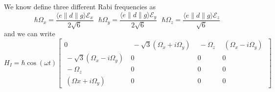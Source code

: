 \documentclass[11pt,letter]{article}
\begin{document}
We know define three different Rabi frequencies as 
\begin{equation}
    \hbar\Omega_{x} = \frac{ \langle e \lVert d \rVert g \rangle \mathcal{E}_{x} }{ 2\sqrt{6}}  \ \ \ 
    \hbar\Omega_{y} = \frac{ \langle e \lVert d \rVert g \rangle \mathcal{E}_{y} }{ 2\sqrt{6}}  \ \ \ 
    \hbar\Omega_{z} = \frac{ \langle e \lVert d \rVert g \rangle \mathcal{E}_{z} }{ \sqrt{6}}  
\end{equation}
and we can write 
\begin{equation}  
  H_{I} =  \hbar \cos(\omega t) 
            \left[\begin{smallmatrix}
            0 & \ -\sqrt{3}(\Omega_{x}+i\Omega_{y})\  &\ -\Omega_{z}\ &\ (\Omega_{x}-i\Omega_{y})\ \\
            \ -\sqrt{3}(\Omega_{x}-i\Omega_{y})\ & 0 & 0 & 0\\
            \ -\Omega_{z}\ & 0 & 0 & 0\\
            \ (\Omega{x}+i\Omega_{y})\  & 0 & 0 & 0
            \end{smallmatrix}\right] 
\end{equation}

\newpage
\end{document}
